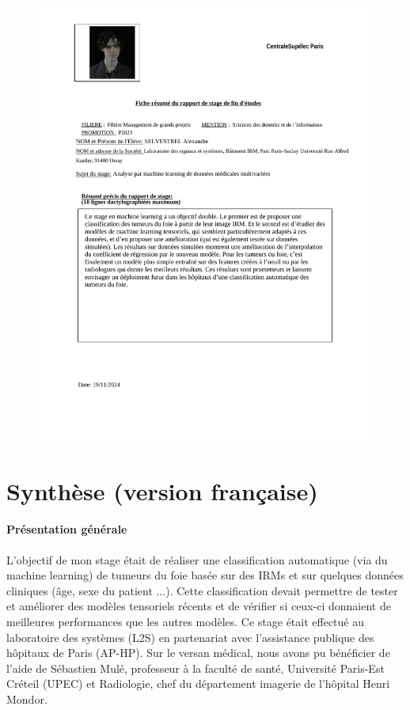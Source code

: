 \documentclass[preprint,12pt]{elsarticle}
\begin{document}
\newpage
{}
\noindent 
\begin{figure}[H]
    \centering
    \includegraphics[scale = 0.85]{images/resume.pdf}
    \label{fig:odt_page}
\end{figure}

\newpage
{}
\section*{Synthèse (version française)}
\vspace*{10 pt}
\paragraph*{Présentation générale} L'objectif de mon stage était de réaliser une classification automatique (via du machine learning) de tumeurs du foie basée sur des IRMs et sur quelques données cliniques (âge, sexe du patient ...). Cette classification devait permettre de tester et améliorer des modèles tensoriels récents \cite{multi_rank_1,multi_rank_r} et de vérifier si ceux-ci donnaient de meilleures performances que les autres modèles. Ce stage était effectué au laboratoire des systèmes (L2S) en partenariat avec l'assistance publique des hôpitaux de Paris (AP-HP). Sur le versan médical, nous avons pu bénéficier de l'aide de Sébastien Mulé, professeur à la faculté de santé, Université Paris-Est Créteil (UPEC) et Radiologie, chef du département imagerie de l'hôpital Henri Mondor.
\end{document}
